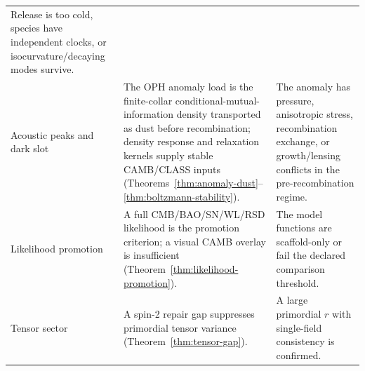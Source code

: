 \documentclass[11pt]{article}
\begin{document}
\begin{longtable}{@{}p{}p{}p{}@{}}
Release is too cold, species have independent clocks, or isocurvature/decaying modes survive.\\
Acoustic peaks and dark slot &
The OPH anomaly load is the finite-collar conditional-mutual-information density transported as
dust before recombination; density response and relaxation kernels supply stable CAMB/CLASS inputs
(Theorems~\ref{thm:anomaly-dust}--\ref{thm:boltzmann-stability}). &
The anomaly has pressure, anisotropic stress, recombination exchange, or growth/lensing conflicts
in the pre-recombination regime.\\
Likelihood promotion &
A full CMB/BAO/SN/WL/RSD likelihood is the promotion criterion; a visual CAMB overlay is insufficient
(Theorem~\ref{thm:likelihood-promotion}). &
The model functions are scaffold-only or fail the declared comparison threshold.\\
Tensor sector &
A spin-2 repair gap suppresses primordial tensor variance
(Theorem~\ref{thm:tensor-gap}). &
A large primordial \(r\) with single-field consistency is confirmed.\\
\end{longtable}
\endgroup
\end{document}
